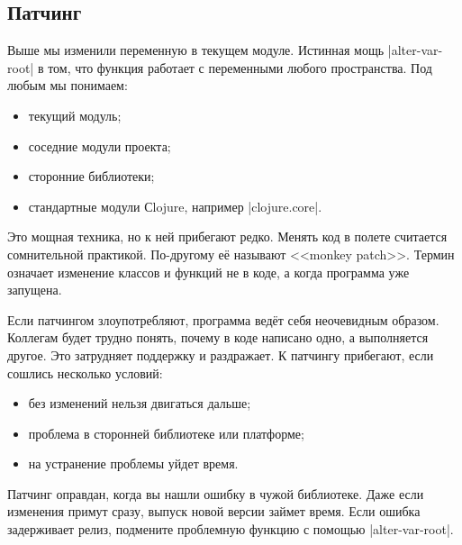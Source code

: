 \subsection{Патчинг}


Выше мы изменили переменную в текущем модуле. Истинная мощь
\spverb|alter-var-root| в том, что функция работает с переменными любого
пространства. Под любым мы понимаем:

\begin{itemize}

\item
  текущий модуль;

\item
  соседние модули проекта;

\item
  сторонние библиотеки;

\item
  стандартные модули Сlojure, например \spverb|clojure.core|.

\end{itemize}


Это мощная техника, но к ней прибегают редко. Менять код в полете считается
сомнительной практикой. По-другому е\"{е} называют <<monkey
patch>>. Термин означает
изменение классов и функций не в коде, а когда программа уже запущена.

Если патчингом злоупотребляют, программа вед\"{е}т себя неочевидным
образом. Коллегам будет трудно понять, почему в коде написано одно, а
выполняется другое. Это затрудняет поддержку и раздражает. К патчингу прибегают,
если сошлись несколько условий:

\begin{itemize}

\item
  без изменений нельзя двигаться дальше;

\item
  проблема в сторонней библиотеке или платформе;

\item
  на устранение проблемы уйдет время.

\end{itemize}

Патчинг оправдан, когда вы нашли ошибку в чужой библиотеке. Даже если изменения
примут сразу, выпуск новой версии займет время. Если ошибка задерживает релиз,
подмените проблемную функцию с помощью \spverb|alter-var-root|.


